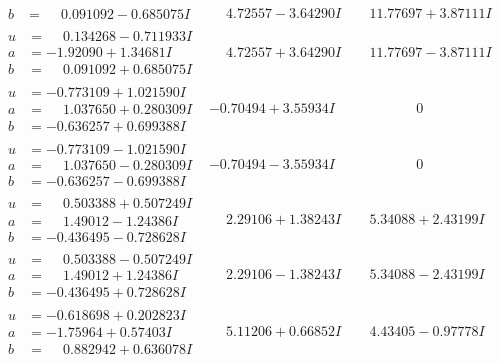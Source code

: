 \documentclass[1p]{elsarticle_modified}
\theoremstyle{definition}
\begin{document}
$$\begin{array}{c|c|c}
\begin{aligned}
b &= \phantom{-}0.091092 - 0.685075 I\end{aligned}
 & \phantom{-}4.72557 - 3.64290 I & \phantom{-}11.77697 + 3.87111 I \\ \hline\begin{aligned}
u &= \phantom{-}0.134268 - 0.711933 I \\
a &= -1.92090 + 1.34681 I \\
b &= \phantom{-}0.091092 + 0.685075 I\end{aligned}
 & \phantom{-}4.72557 + 3.64290 I & \phantom{-}11.77697 - 3.87111 I \\ \hline\begin{aligned}
u &= -0.773109 + 1.021590 I \\
a &= \phantom{-}1.037650 + 0.280309 I \\
b &= -0.636257 + 0.699388 I\end{aligned}
 & -0.70494 + 3.55934 I & \phantom{-0.000000 } 0 \\ \hline\begin{aligned}
u &= -0.773109 - 1.021590 I \\
a &= \phantom{-}1.037650 - 0.280309 I \\
b &= -0.636257 - 0.699388 I\end{aligned}
 & -0.70494 - 3.55934 I & \phantom{-0.000000 } 0 \\ \hline\begin{aligned}
u &= \phantom{-}0.503388 + 0.507249 I \\
a &= \phantom{-}1.49012 - 1.24386 I \\
b &= -0.436495 - 0.728628 I\end{aligned}
 & \phantom{-}2.29106 + 1.38243 I & \phantom{-}5.34088 + 2.43199 I \\ \hline\begin{aligned}
u &= \phantom{-}0.503388 - 0.507249 I \\
a &= \phantom{-}1.49012 + 1.24386 I \\
b &= -0.436495 + 0.728628 I\end{aligned}
 & \phantom{-}2.29106 - 1.38243 I & \phantom{-}5.34088 - 2.43199 I \\ \hline\begin{aligned}
u &= -0.618698 + 0.202823 I \\
a &= -1.75964 + 0.57403 I \\
b &= \phantom{-}0.882942 + 0.636078 I\end{aligned}
 & \phantom{-}5.11206 + 0.66852 I & \phantom{-}4.43405 - 0.97778 I \\ \hline\begin{aligned}

\end{aligned}
\end{array}$$
\end{document}
